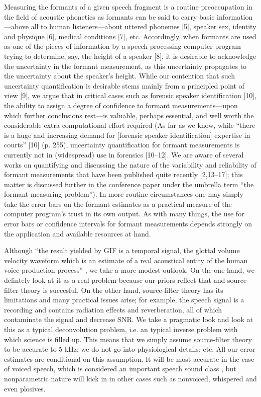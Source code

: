 Measuring the formants of a given speech fragment is a routine preoccupation in the field of acoustic
phonetics as formants can be said to carry basic information—above all to human listeners—about
uttered phonemes [5], speaker sex, identity and physique [6], medical conditions [7], etc.
Accordingly, when formants are used as one of the pieces of information by a speech processing
computer program trying to determine, say, the height of a speaker [8], it is desirable to acknowledge
the uncertainty in the formant measurement, as this uncertainty propagates to the uncertainty about
the speaker’s height. While our contention that such uncertainty quantification is desirable stems
mainly from a principled point of view [9], we argue that in critical cases such as forensic speaker
identification [10], the ability to assign a degree of confidence to formant measurements—upon
which further conclusions rest—is valuable, perhaps essential, and well worth the considerable extra
computational effort required (As far as we know, while “there is a huge and increasing demand for
[forensic speaker identification] expertise in courts” [10] (p. 255), uncertainty quantification for formant
measurements is currently not in (widespread) use in forensics [10–12]. We are aware of several works
on quantifying and discussing the nature of the variability and reliability of formant measurements
that have been published quite recently [2,13–17]; this matter is discussed further in the conference
paper under the umbrella term “the formant measuring problem”). In more routine circumstances
one may simply take the error bars on the formant estimates as a practical measure of the computer
program’s trust in its own output. As with many things, the use for error bars or confidence intervals
for formant measurements depends strongly on the application and available resources at hand.


Although ``the result yielded by GIF is a temporal signal, the glottal volume velocity waveform which is an estimate of a real acoustical entity of the human voice production process'' \citep[p.~640]{Alku2011}, we take a more modest outlook.
On the one hand, we defintely look at it as a real problem because our priors reflect that and source-filter theory is succesful.
On the other hand, source-filter theory has its limitations \citep{Chen2016,Maurer2016} and many practical issues arise; for example, the speech signal is a recording and contains radiation effects and reverberation, all of which contaminate the signal and decrease SNR.
We take a pragmatic look and look at this as a typical deconvolution problem, i.e. an typical inverse problem with which science is filled up.
This means that we simply assume source-filter theory to be accurate to 5 kHz; we do not go into physiological details; etc.
All our error estimates are conditional on this assumption.
It will be most accurate in the case of voiced speech, which is considered an important speech sound class \citep{Alku2011}, but nonparametric nature will kick in in other cases such as nonvoiced, whispered and even plosives.


